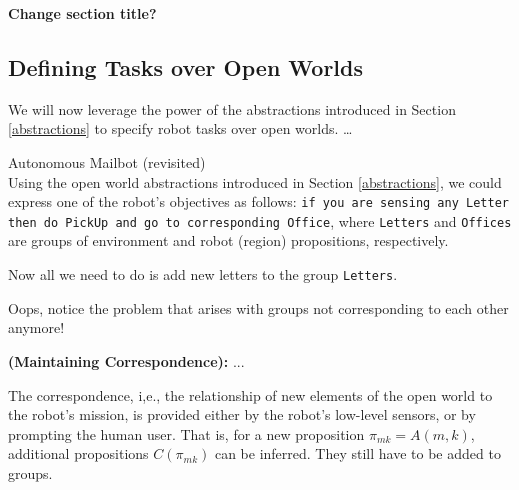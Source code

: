 \textbf{Change section title?} %

\subsection{Defining Tasks over Open Worlds}

We will now leverage the power of the abstractions introduced in Section \ref{abstractions} to specify robot tasks over open worlds. \ldots

\begin{myExample}\label{Ex:mailbot2} Autonomous Mailbot (revisited)\\
	Using the open world abstractions introduced in Section \ref{abstractions}, we could express one of the robot's objectives as follows: 
\texttt{if you are sensing any Letter then do PickUp and go to corresponding Office}, where \texttt{Letters} and \texttt{Offices} are groups of environment and robot (region) propositions, respectively.
\end{myExample}

Now all we need to do is add new letters to the group \texttt{Letters}.

Oops, notice the problem that arises with groups not corresponding to each other anymore!

%	

\begin{myProblem}\label{Prob:mission}
	\textbf{(Maintaining Correspondence):}
	...
\end{myProblem}

\begin{myAssumption}
	The correspondence, i,e., the relationship of new elements of the open world to the robot's mission, is provided either by the robot's low-level sensors, or by prompting the human user. That is, for a new proposition $\pi_{mk} = A(m, k)$, additional propositions $C(\pi_{mk})$ can be inferred. They still have to be added to groups.
\end{myAssumption}

